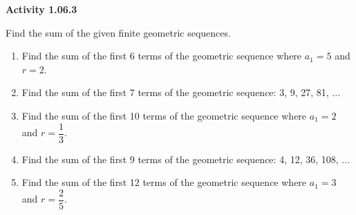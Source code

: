 \vspace{0.3ex}
\noindent\textbf{Activity 1.06.3}

\vspace{0.2ex}

Find the sum of the given finite geometric sequences.
\begin{enumerate}
    \item Find the sum of the first 6 terms of the geometric sequence where \( a_1 = 5 \) and \( r = 2 \).
    \item Find the sum of the first 7 terms of the geometric sequence: 3, 9, 27, 81, ...
    \item Find the sum of the first 10 terms of the geometric sequence where \( a_1 = 2 \) and \( r = \dfrac{1}{3} \).
    \item Find the sum of the first 9 terms of the geometric sequence: 4, 12, 36, 108, ...
    \item Find the sum of the first 12 terms of the geometric sequence where \( a_1 = 3 \) and \( r = \dfrac{2}{5} \).
\end{enumerate}

